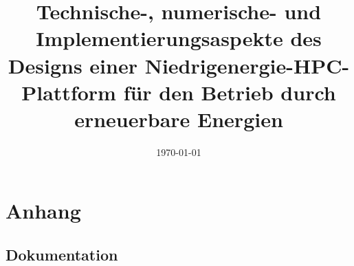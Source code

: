 \documentclass[12pt,a4paper, oneside,ngerman]{scrartcl}
\title{\large{Technische-, numerische- und Implementierungsaspekte des Designs einer Niedrigenergie-HPC-Plattform für den Betrieb durch erneuerbare Energien}}
\date{\today}
\begin{document}
\maketitle
\newpage
\tableofcontents
\newpage





%

\section{Anhang}

\subsection{Dokumentation}
%
\end{document}
